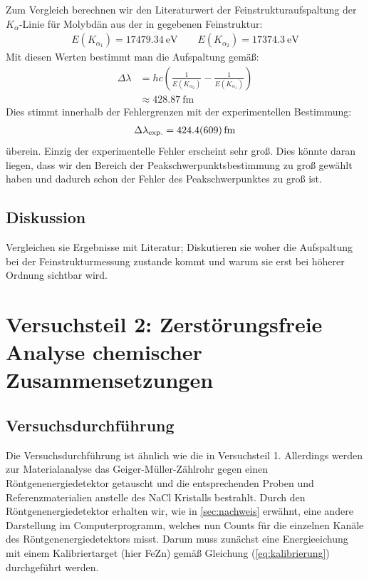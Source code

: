 \documentclass[10pt, a4paper]{article}
\begin{document}
Zum Vergleich berechnen wir den Literaturwert der Feinstrukturaufspaltung der $K_\alpha$-Linie für Molybdän aus der in \cite{booklet} gegebenen Feinstruktur:
\begin{align*}
  E(K_{\alpha_1}) = \SI{17479,34}{\electronvolt} \qquad E(K_{\alpha_2}) = \SI{17374,3}{\electronvolt}
\end{align*}
Mit diesen Werten bestimmt man die Aufspaltung gemäß:
\begin{align*}
  \Delta \lambda &= h c \left( \frac{1}{E(K_{\alpha_2})} - \frac{1}{E(K_{\alpha_1})} \right) \\
  &\approx \SI{428,87}{\femto\metre}
\end{align*}
Dies stimmt innerhalb der Fehlergrenzen mit der experimentellen Bestimmung:
\begin{align*}
  \Delta \lambda_\mathrm{exp.} = \SI{424,4+-60,9}{\femto\metre}
\end{align*}
überein.
Einzig der experimentelle Fehler erscheint sehr groß.
Dies könnte daran liegen, dass wir den Bereich der Peakschwerpunktsbestimmung zu groß gewählt haben und dadurch schon der Fehler des Peakschwerpunktes zu groß ist.

\subsection{Diskussion}
Vergleichen sie Ergebnisse mit Literatur; Diskutieren sie woher die Aufspaltung bei der Feinstrukturmessung zustande kommt und warum sie erst bei höherer Ordnung sichtbar wird.


\section{Versuchsteil 2: Zerstörungsfreie Analyse chemischer Zusammensetzungen}
\subsection{Versuchsdurchführung}
Die Versuchsdurchführung ist ähnlich wie die in Versuchsteil 1.
Allerdings werden zur Materialanalyse das Geiger-Müller-Zählrohr gegen einen Röntgenenergiedetektor getauscht und die entsprechenden Proben und Referenzmaterialien anstelle des NaCl Kristalls bestrahlt.
Durch den Röntgenenergiedetektor erhalten wir, wie in \ref{sec:nachweis} erwähnt, eine andere Darstellung im Computerprogramm, welches nun Counts für die einzelnen Kanäle des Röntgenenergiedetektors misst. Darum muss zunächst eine Energieeichung mit einem Kalibriertarget (hier FeZn) gemäß Gleichung (\ref{eq:kalibrierung}) durchgeführt werden.
\end{document}
